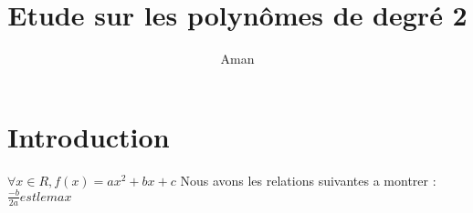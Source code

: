 \documentclass{article}
\author{Aman}
\title{Etude sur les polynômes de degré 2}
\begin{document}
\maketitle
\section{Introduction}
$ \forall x \in R, f(x)=ax^{2}+bx+c$
Nous avons les relations suivantes a montrer : 
$ \frac{-b}{2a} est le max $
\end{document}
